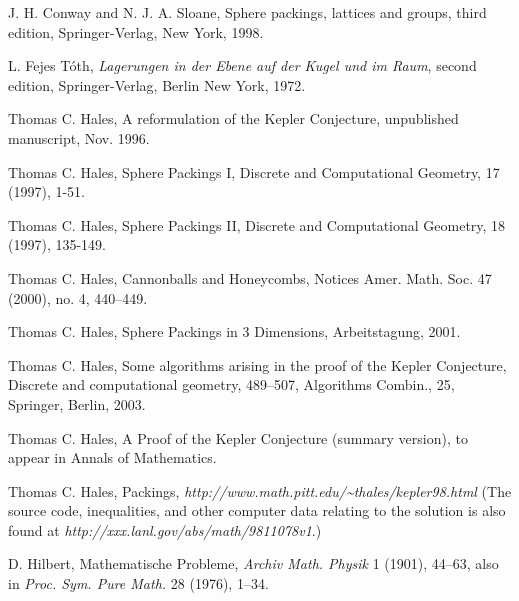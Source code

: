 \documentclass[11pt]{amsart}
\begin{document}
\begin{thebibliography}{Hal97b}

 J. H. Conway and N. J. A. Sloane, Sphere packings, lattices
    and groups,  third edition, Springer-Verlag, New York, 1998.

 L. Fejes T\'oth, {\it Lagerungen in der Ebene auf der
    Kugel und im Raum}, second edition,
    Springer-Verlag, Berlin New York, 1972.

 Thomas C. Hales, A reformulation of the
Kepler Conjecture, unpublished manuscript, Nov. 1996.

 Thomas C. Hales, Sphere Packings I,
    Discrete and Computational Geometry, 17 (1997), 1-51.

 Thomas C. Hales, Sphere Packings II,
    Discrete and Computational Geometry, 18 (1997), 135-149.

 Thomas C. Hales, Cannonballs and Honeycombs,
Notices Amer. Math. Soc.  47  (2000),  no. 4, 440--449.

 Thomas C. Hales, Sphere Packings in 3
Dimensions, Arbeitstagung, 2001.

 Thomas C. Hales, Some algorithms arising in
the proof of the Kepler Conjecture, Discrete and computational
geometry, 489--507, Algorithms Combin., 25, Springer, Berlin, 2003.

 Thomas C. Hales, A Proof of the
Kepler Conjecture (summary version), to appear in Annals of
Mathematics.

 Thomas C. Hales, Packings, \hfill\break
    \hfill{\it http://www.math.pitt.edu/\~%
    \relax thales/kepler98.html} \hfil\break
     (The source code, inequalities,
    and other computer data relating to the solution is also found
    at {\it http://xxx.lanl.gov/abs/math/9811078v1}.)

D. Hilbert, Mathematische Probleme, {\it Archiv Math. Physik} 1
(1901), 44--63, also in {\it Proc. Sym. Pure Math.} 28 (1976),
1--34.

\end{thebibliography}
\end{document}
